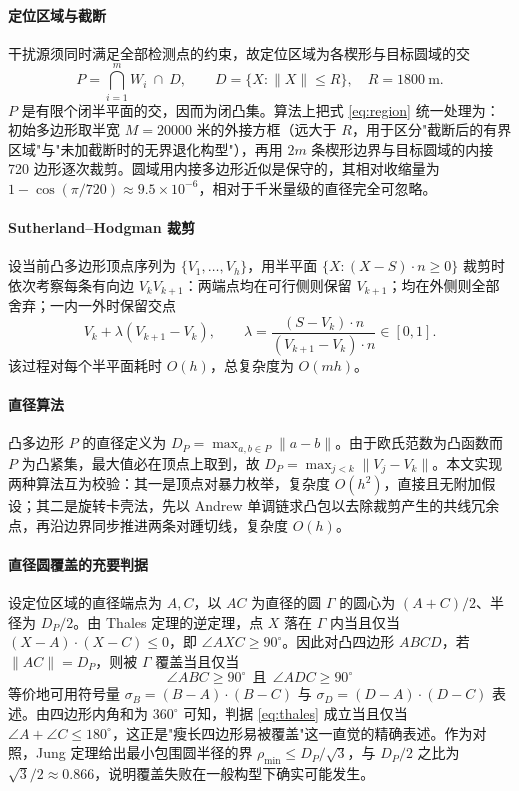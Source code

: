 \paragraph{定位区域与截断} 干扰源须同时满足全部检测点的约束，故定位区域为各楔形与目标圆域的交
\begin{equation}
P=\bigcap_{i=1}^{m}W_i\ \cap\ D,\qquad D=\{X:\lVert X\rVert\le R\},\quad R=1800\ \text{m}.
\label{eq:region}
\end{equation}
$P$ 是有限个闭半平面的交，因而为闭凸集。算法上把式 \eqref{eq:region} 统一处理为：初始多边形取半宽 $M=20000$ 米的外接方框（远大于 $R$，用于区分"截断后的有界区域"与"未加截断时的无界退化构型"），再用 $2m$ 条楔形边界与目标圆域的内接 720 边形逐次裁剪。圆域用内接多边形近似是保守的，其相对收缩量为 $1-\cos(\pi/720)\approx9.5\times10^{-6}$，相对于千米量级的直径完全可忽略。

\paragraph{Sutherland--Hodgman 裁剪} 设当前凸多边形顶点序列为 $\{V_1,\dots,V_h\}$，用半平面 $\{X:(X-S)\cdot n\ge0\}$ 裁剪时依次考察每条有向边 $V_kV_{k+1}$：两端点均在可行侧则保留 $V_{k+1}$；均在外侧则全部舍弃；一内一外时保留交点
\begin{equation}
V_k+\lambda(V_{k+1}-V_k),\qquad
\lambda=\frac{(S-V_k)\cdot n}{(V_{k+1}-V_k)\cdot n}\in[0,1].
\label{eq:clip}
\end{equation}
该过程对每个半平面耗时 $O(h)$，总复杂度为 $O(mh)$。

\paragraph{直径算法} 凸多边形 $P$ 的直径定义为 $D_P=\max_{a,b\in P}\lVert a-b\rVert$。由于欧氏范数为凸函数而 $P$ 为凸紧集，最大值必在顶点上取到，故 $D_P=\max_{j<k}\lVert V_j-V_k\rVert$。本文实现两种算法互为校验：其一是顶点对暴力枚举，复杂度 $O(h^2)$，直接且无附加假设；其二是旋转卡壳法，先以 Andrew 单调链求凸包以去除裁剪产生的共线冗余点，再沿边界同步推进两条对踵切线，复杂度 $O(h)$。

\paragraph{直径圆覆盖的充要判据} 设定位区域的直径端点为 $A,C$，以 $AC$ 为直径的圆 $\Gamma$ 的圆心为 $(A+C)/2$、半径为 $D_P/2$。由 Thales 定理的逆定理，点 $X$ 落在 $\Gamma$ 内当且仅当 $(X-A)\cdot(X-C)\le0$，即 $\angle AXC\ge90^\circ$。因此对凸四边形 $ABCD$，若 $\lVert AC\rVert=D_P$，则被 $\Gamma$ 覆盖当且仅当
\begin{equation}
\boxed{\ \angle ABC\ge90^\circ\ \ \text{且}\ \ \angle ADC\ge90^\circ\ }
\label{eq:thales}
\end{equation}
等价地可用符号量 $\sigma_B=(B-A)\cdot(B-C)$ 与 $\sigma_D=(D-A)\cdot(D-C)$ 表述。由四边形内角和为 $360^\circ$ 可知，判据 \eqref{eq:thales} 成立当且仅当 $\angle A+\angle C\le180^\circ$，这正是"瘦长四边形易被覆盖"这一直觉的精确表述。作为对照，Jung 定理给出最小包围圆半径的界 $\rho_{\min}\le D_P/\sqrt3$，与 $D_P/2$ 之比为 $\sqrt3/2\approx0.866$，说明覆盖失败在一般构型下确实可能发生。

